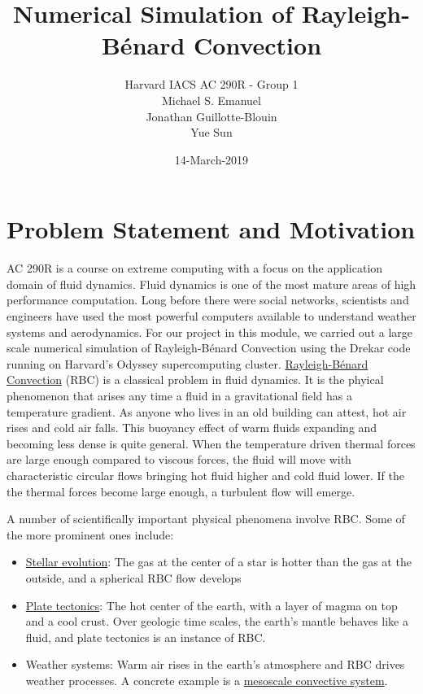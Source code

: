 \documentclass[11pt]{article} %
\title{Numerical Simulation of Rayleigh-B\'enard Convection}
\author{Harvard IACS AC 290R - Group 1 \\
Michael S. Emanuel \\
Jonathan Guillotte-Blouin \\
Yue Sun \\
}
\date{14-March-2019}
\begin{document}
\maketitle

\section{Problem Statement and Motivation}
AC 290R is a course on extreme computing with a focus on the application domain of fluid dynamics.
Fluid dynamics is one of the most mature areas of high performance computation.
Long before there were social networks, scientists and engineers have used 
the most powerful computers available to understand weather systems and aerodynamics.
For our project in this module, we carried out a large scale numerical simulation of 
Rayleigh-B\'enard Convection using the Drekar code running on Harvard's Odyssey supercomputing cluster.  
\href{https://en.wikipedia.org/wiki/Rayleigh%E2\%80%93B%C3%A9nard_convection}
{Rayleigh-B\'enard Convection} (RBC) is a classical problem in fluid dynamics.
It is the phyical phenomenon that arises any time a fluid in a gravitational field has a temperature gradient.
As anyone who lives in an old building can attest, hot air rises and cold air falls.  
This buoyancy effect of warm fluids expanding and becoming less dense is quite general.
When the temperature driven thermal forces are large enough compared to viscous forces,
the fluid will move with characteristic circular flows bringing hot fluid higher and cold fluid lower.
If the the thermal forces become large enough, a turbulent flow will emerge.

A number of scientifically important physical phenomena involve RBC.
Some of the more prominent ones include:
\begin{itemize}
\item\href{https://en.wikipedia.org/wiki/Stellar_evolution}{Stellar evolution}:
The gas at the center of a star is hotter than the gas at the outside, and a spherical RBC flow develops
\item\href{https://en.wikipedia.org/wiki/Plate_tectonics}{Plate tectonics}:
The hot center of the earth, with a layer of magma on top and a cool crust.  
Over geologic time scales, the earth's mantle behaves like a fluid, and plate tectonics is an instance of RBC.
\item{Weather systems}: Warm air rises in the earth's atmosphere and RBC drives weather processes. 
A concrete example is a \href{https://en.wikipedia.org/wiki/Mesoscale_convective_system}{mesoscale convective system}.
\end{itemize}
\end{document}
